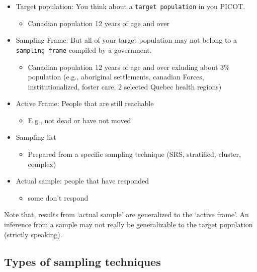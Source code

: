 \documentclass[
]{book}
\providecommand{\tightlist}{%
  \setlength{\itemsep}{0pt}\setlength{\parskip}{0pt}}
\begin{document}
\begin{itemize}
\tightlist
\item
  Target population: You think about a \texttt{target\ population} in you PICOT.

  \begin{itemize}
  \tightlist
  \item
    Canadian population 12 years of age and over
  \end{itemize}
\item
  Sampling Frame: But all of your target population may not belong to a \texttt{sampling\ frame} compiled by a government.

  \begin{itemize}
  \tightlist
  \item
    Canadian population 12 years of age and over exluding about 3\% population (e.g., aboriginal settlements, canadian Forces, institutionalized, foster care, 2 selected Quebec health regions)
  \end{itemize}
\item
  Active Frame: People that are still reachable

  \begin{itemize}
  \tightlist
  \item
    E.g., not dead or have not moved
  \end{itemize}
\item
  Sampling list

  \begin{itemize}
  \tightlist
  \item
    Prepared from a specific sampling technique (SRS, stratified, cluster, complex)
  \end{itemize}
\item
  Actual sample: people that have responded

  \begin{itemize}
  \tightlist
  \item
    some don't respond
  \end{itemize}
\end{itemize}

Note that, results from `actual sample' are generalized to the `active frame'. An inference from a sample may not really be generalizable to the target population (strictly speaking).

\hypertarget{types-of-sampling-techniques}{%
\subsection{Types of sampling techniques}\label{types-of-sampling-techniques}}
\end{document}
